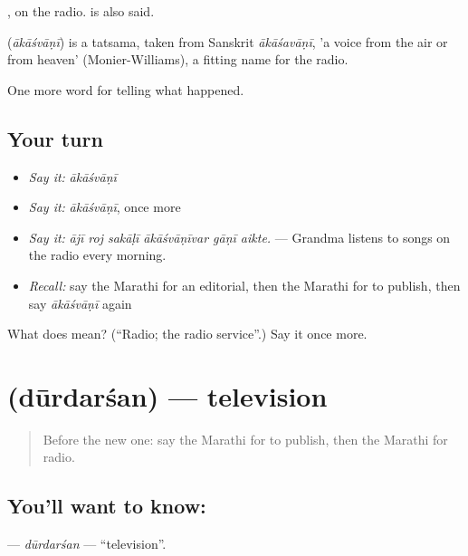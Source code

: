 , on the radio.  is also said.

\begin{cousinweb}
\textbf{} (\emph{ākāśvāṇī}) is a tatsama, taken from Sanskrit \emph{ākāśavāṇī}, 'a voice from the air or from heaven' (Monier-Williams), a fitting name for the radio.
\end{cousinweb}

\begin{grammarlens}[title={What you've built}]
One more word for telling what happened.
\end{grammarlens}

\subsection*{Your turn}
\begin{itemize}
\raggedright
  \item \emph{Say it:} \emph{ākāśvāṇī}
  \item \emph{Say it:} \emph{ākāśvāṇī}, once more
  \item \emph{Say it:} \emph{ājī roj sakāḷī ākāśvāṇīvar gāṇī aikte.} — Grandma listens to songs on the radio every morning.
  \item \emph{Recall:} say the Marathi for an editorial, then the Marathi for to publish, then say \emph{ākāśvāṇī} again
\end{itemize}

\begin{tcolorbox}[breakable,colback=teal!4,colframe=teal!35!black,title={Before you move on}]
What does  mean? (\textquotedblleft{}Radio; the radio service\textquotedblright{}.) Say it once more.
\end{tcolorbox}
\section[\texorpdfstring{\mr{दूरदर्शन} (dūrdarśan)}{दूरदर्शन (dūrdarśan)}]{ (dūrdarśan) — television}

\label{lesson:MR-C312-durdarsan}



\begin{quote}
Before the new one: say the Marathi for to publish, then the Marathi for radio.
\end{quote}

\subsection*{You'll want to know: }
\textbf{} — \emph{dūrdarśan} — \textquotedblleft{}television\textquotedblright{}.

